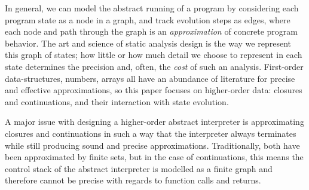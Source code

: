 
In general, we can model the abstract running of a program by
considering each program state as a node in a graph, and track
evolution steps as edges, where each node and path through the graph
is an \emph{approximation} of concrete program behavior.
%
The art and science of static analysis design is the way we represent this graph of states; how little or how much detail we choose to represent in each state determines the precision and, often, the \emph{cost} of such an analysis.
%
First-order data-structures, numbers, arrays all have an abundance of
literature for precise and effective approximations, so this paper
focuses on higher-order data: closures and continuations, and their
interaction with state evolution.

A major issue with designing a higher-order abstract interpreter is
approximating closures and continuations in such a way that the
interpreter always terminates while still producing sound and precise
approximations.  Traditionally, both have been approximated by finite
sets, but in the case of continuations, this means the control stack
of the abstract interpreter is modelled as a finite graph and
therefore cannot be precise with regards to function calls and
returns.


